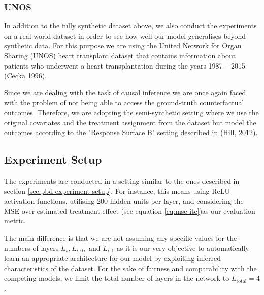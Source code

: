 
\subsubsection{UNOS}
In addition to the fully synthetic dataset above, we also conduct the experiments on a real-world dataset in order to see how well our model generalises beyond synthetic data. For this purpose we are using the United Network for Organ Sharing (UNOS) heart transplant dataset  
that contains information about patients who underwent a heart transplantation during the years 1987 -- 2015 (Cecka 1996).%

Since we are dealing with the task of causal inference we are once again faced with the problem of not being able to access the ground-truth counterfactual outcomes. Therefore, we are adopting the semi-synthetic setting where we use the original covariates and the treatment assignment from the dataset but model the outcomes according to the "Response Surface B" setting described in (Hill, 2012). %



\subsection{Experiment Setup}
The experiments are conducted in a setting similar to the ones described in section \ref{sec:pbd-experiment-setup}. For instance, this means using ReLU activation functions, utilising 200 hidden units per layer, and considering the MSE over estimated treatment effect (see equation \ref{eq:mse-ite})as our evaluation metric. 

The main difference is that we are not assuming any specific values for the numbers of layers $L_s, L_{i,0},$ and $L_{i,1}$ as it is our very objective to automatically learn an appropriate architecture for our model by exploiting inferred characteristics of the dataset. For the sake of fairness and  comparability with the competing models, we limit the total number of layers in the network to $L_{\text{total}} = 4$. 

